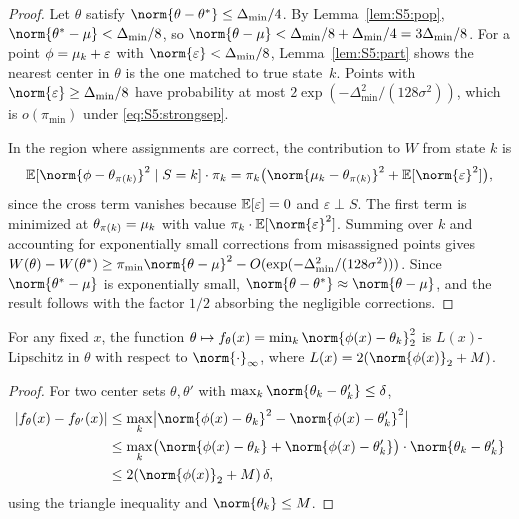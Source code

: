 \begin{proof}
Let $\theta$ satisfy $\norm{\theta-\theta^*}\le\Delta_{\min}/4$.  By
Lemma~\ref{lem:S5:pop}, $\norm{\theta^*-\mu}<\Delta_{\min}/8$, so
$\norm{\theta-\mu}<\Delta_{\min}/8+\Delta_{\min}/4=3\Delta_{\min}/8$.
For a point $\phi=\mu_k+\varepsilon$ with $\norm{\varepsilon}<\Delta_{\min}/8$,
Lemma~\ref{lem:S5:part} shows the nearest center in $\theta$ is the one
matched to true state~$k$.  Points with $\norm{\varepsilon}\ge\Delta_{\min}/8$
have probability at most $2\exp(-\Delta_{\min}^2/(128\sigma^2))$, which is
$o(\pi_{\min})$ under \eqref{eq:S5:strongsep}.

In the region where assignments are correct, the contribution to $W$ from
state $k$ is
\[
\E[\norm{\phi-\theta_{\pi(k)}}^2\mid S=k]\cdot\pi_k
= \pi_k\bigl(\norm{\muk-\theta_{\pi(k)}}^2+\E[\norm{\varepsilon}^2]\bigr),
\]
since the cross term vanishes because $\mathbb{E}[\varepsilon]=0$ and
$\varepsilon\perp S$.  The first term is minimized at
$\theta_{\pi(k)}=\mu_k$ with value $\pi_k\cdot\E[\norm{\varepsilon}^2]$.
Summing over $k$ and accounting for exponentially small corrections from
misassigned points gives
$W(\theta)-W(\theta^*)\ge\pi_{\min}\norm{\theta-\mu}^2
 - O(\exp(-\Delta_{\min}^2/(128\sigma^2)))$.
Since $\norm{\theta^*-\mu}$ is exponentially small,
$\norm{\theta-\theta^*}\approx\norm{\theta-\mu}$, and the result
follows with the factor $1/2$ absorbing the negligible corrections.
\end{proof}

\begin{lemma}
\label{lem:S5:lipschitz}
For any fixed $x$, the function
$\theta\mapsto f_\theta(x)=\min_k\norm{\phi(x)-\theta_k}_2^2$ is
$L(x)$-Lipschitz in $\theta$ with respect to $\norm{\cdot}_\infty$,
where $L(x)=2(\norm{\phi(x)}_2+M)$.
\end{lemma}

\begin{proof}
For two center sets $\theta,\theta'$ with
$\max_k\norm{\theta_k-\theta'_k}\le\delta$,
\begin{align*}
|f_\theta(x)-f_{\theta'}(x)|
&\le \max_k\bigl|\norm{\phi(x)-\theta_k}^2
            -\norm{\phi(x)-\theta'_k}^2\bigr| \\
&\le \max_k\bigl(\norm{\phi(x)-\theta_k}+\norm{\phi(x)-\theta'_k}\bigr)
    \cdot\norm{\theta_k-\theta'_k} \\
&\le 2(\norm{\phi(x)}_2+M)\,\delta,
\end{align*}
using the triangle inequality and $\norm{\theta_k}\le M$.
\end{proof}

